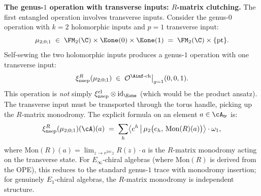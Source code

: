 \begin{construction}
\medskip\noindent
\textbf{The genus-$1$ operation with transverse inputs:
$R$-matrix clutching.}
The first entangled operation involves transverse inputs.
Consider the genus-$0$ operation with $k=2$
holomorphic inputs and $p=1$ transverse input:
\[
 \mu_{2;0;1} \;\in\;
 \FM_2(\C) \times \Eone(0) \times \Eone(1)
 \;=\; \FM_2(\C) \times \{\mathrm{pt}\}.
\]
Self-sewing the two holomorphic inputs produces
a genus-$1$ operation with one transverse input:
\begin{equation}\label{eq:genus1-transverse-operation}
 \xi_{\mathrm{nsep}}^{R}(\mu_{2;0;1})
 \;\in\;
 \mathcal{O}^{\Ainf\text{-ch}}\big|_{g=1}(0,0,1).
\end{equation}
This operation is \emph{not} simply
$\xi_{\mathrm{nsep}}^{\mathrm{cl}} \otimes
\mathrm{id}_{\Eone}$ (which would be the product
ansatz). The transverse input must be transported
through the torus handle, picking up the $R$-matrix
monodromy. The explicit formula on an element
$a \in \cA_{\mathsf{tr}}$ is:
\begin{equation}\label{eq:R-matrix-clutching}
 \xi_{\mathrm{nsep}}^{R}(\mu_{2;0;1})(\cA)(a)
 \;=\;
 \sum_h
 \bigl\langle e^h \,\big|\,
 \mu_2\bigl(e_h,\,
 \mathrm{Mon}(R)(a)\bigr)
 \bigr\rangle
 \cdot \omega_1,
\end{equation}
where $\mathrm{Mon}(R)(a) =
\lim_{z \to e^{2\pi i}z} R(z) \cdot a$
is the $R$-matrix monodromy acting on the transverse
state. For $E_\infty$-chiral algebras (where
$\mathrm{Mon}(R)$ is derived from the OPE), this
reduces to the standard genus-$1$ trace with monodromy
insertion; for genuinely $E_1$-chiral algebras, the
$R$-matrix monodromy is independent structure.


\end{construction}
